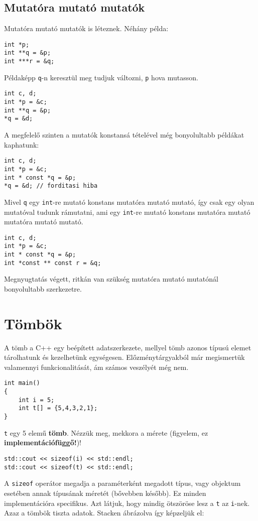 \documentclass[a4paper,11.5pt,table]{article}
\begin{document}
	\subsection{Mutatóra mutató mutatók} 
	Mutatóra mutató mutatók is léteznek. Néhány példa:
	\begin{lstlisting}
int *p;
int **q = &p;
int ***r = &q;
	\end{lstlisting}
	Példaképp \texttt{q}-n keresztül meg tudjuk változni, \texttt{p} hova mutasson.
	\begin{lstlisting}
int c, d;
int *p = &c;
int **q = &p;
*q = &d;
	\end{lstlisting}
	A megfelelő szinten a mutatók konstansá tételével még bonyolultabb példákat kaphatunk:
	\begin{lstlisting}
int c, d;
int *p = &c;
int * const *q = &p;
*q = &d; // forditasi hiba
	\end{lstlisting}
	Mivel \texttt{q} egy \texttt{int}-re mutató konstans mutatóra mutató mutató, így csak egy olyan mutatóval tudunk rámutatni, ami egy \texttt{int}-re mutató konstans mutatóra mutató mutatóra mutató mutató.
	\begin{lstlisting}
int c, d;
int *p = &c;
int * const *q = &p;
int *const ** const r = &q;
	\end{lstlisting}
	\begin{note}
		Megnyugtatás végett, ritkán van szükség mutatóra mutató mutatónál bonyolultabb szerkezetre.
	\end{note}\section{Tömbök}
	A tömb a C++ egy beépített adatszerkezete, mellyel tömb azonos típusú elemet tárolhatunk és kezelhetünk egységesen. Előzménytárgyakból már megismertük valamennyi funkcionalitását, ám számos veszélyét még nem.
	\begin{lstlisting}
int main()
{
	int i = 5;
	int t[] = {5,4,3,2,1};
}
	\end{lstlisting}
	\texttt{t} egy 5 elemű \textbf{tömb}. Nézzük meg, mekkora a mérete (figyelem, ez \textbf{implementációfüggő!})!
	\begin{lstlisting}
std::cout << sizeof(i) << std::endl;
std::cout << sizeof(t) << std::endl;
	\end{lstlisting}
	A \texttt{sizeof} operátor megadja a paraméterként megadott típus, vagy objektum esetében annak típusának méretét (bővebben később). Ez minden implementációra specifikus. Azt látjuk, hogy mindig ötszöröse lesz a \texttt{t} az \texttt{i}-nek. Azaz a tömbök tiszta adatok.  Stacken ábrázolva így képzeljük el:
	
\end{document}
